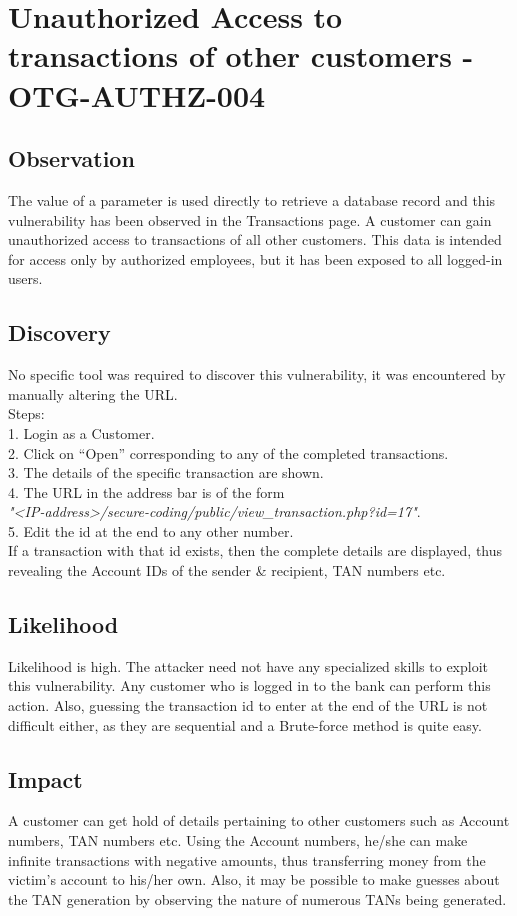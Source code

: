 \section{Unauthorized Access to transactions of other customers - OTG-AUTHZ-004}

\subsection{Observation}
The value of a parameter is used directly to retrieve a database record and this vulnerability has been observed in the Transactions page.
A customer can gain unauthorized access to transactions of all other customers. This data is intended for access only by authorized employees, but it has been exposed to all logged-in users. 

\subsection{Discovery}
No specific tool was required to discover this vulnerability, it was encountered by manually altering the URL.\\
Steps: \\
1. Login as a Customer. \\
2. Click on “Open” corresponding to any of the completed transactions. \\
3. The details of the specific transaction are shown. \\
4. The URL in the address bar is of the form \\ \textit{"<IP-address>/secure-coding/public/view\_transaction.php?id=17"}. \\
5. Edit the id at the end to any other number. \\
If a transaction with that id exists, then the complete details are displayed, thus revealing the Account IDs of the sender \& recipient, TAN numbers etc. \\

\subsection{Likelihood}
Likelihood is high.
The attacker need not have any specialized skills to exploit this vulnerability. Any customer who is logged in to the bank can perform this action. Also, guessing the transaction id to enter at the end of the URL is not difficult either, as they are sequential and a Brute-force method is quite easy.

\subsection{Impact}
A customer can get hold of details pertaining to other customers such as Account numbers, TAN numbers etc. Using the Account numbers, he/she can make infinite transactions with negative amounts, thus transferring money from the victim's account to his/her own.
Also, it may be possible to make guesses about the TAN generation by observing the nature of numerous TANs being generated.

